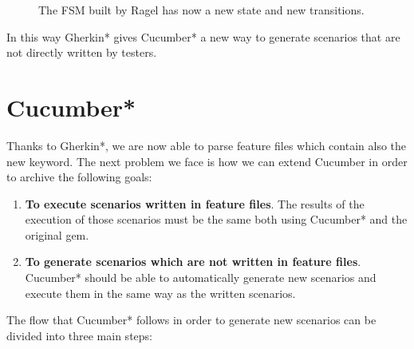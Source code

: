 \begin{figure}[h!]
{
	}
	\vspace{0.1cm}
	\caption{The FSM built by Ragel has now a new state and new transitions.}
	\label{figure:gherkin_automaton_simple_with_next_scenario}
	\vspace{0.2cm}
\end{figure}

\noindent In this way Gherkin* gives Cucumber* a new way to generate scenarios that are not directly written by testers.

\newpage
\section{Cucumber*}

Thanks to Gherkin*, we are now able to parse feature files which contain also the new keyword. The next problem we face is how we can extend Cucumber in order to archive the following goals:

\begin{enumerate}
\item \textbf{To execute scenarios written in feature files}. The results of the execution of those scenarios must be the same both using Cucumber* and the original gem.
\item \textbf{To generate scenarios which are not written in feature files}. Cucumber* should be able to automatically generate new scenarios and execute them in the same way as the written scenarios.
\end{enumerate}

\noindent The flow that Cucumber* follows in order to generate new scenarios can be divided into three main steps:

